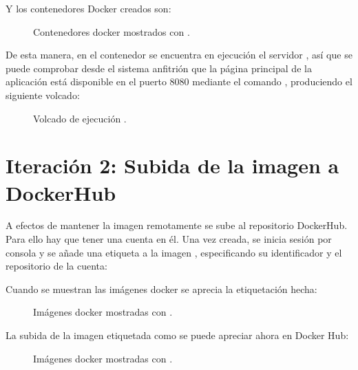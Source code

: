 Y los contenedores Docker creados son:

\begin{figure}[H]
\caption{Contenedores docker mostrados con .\label{fig:figure_placement_example}}
\end{figure}

De esta manera, en el contenedor  se encuentra en ejecución el servidor , así que se puede comprobar desde el sistema anfitrión que la página principal de la aplicación  está disponible en el puerto 8080 mediante el comando , produciendo el siguiente volcado:

\begin{figure}[H]
\caption{Volcado de ejecución .\label{fig:figure_placement_example}}
\end{figure}

\section{Iteración 2: Subida de la imagen a DockerHub}

A efectos de mantener la imagen remotamente se sube al repositorio DockerHub. Para ello hay que tener una cuenta en él. Una vez creada, se inicia sesión por consola y se añade una etiqueta a la imagen , especificando su identificador y el repositorio de la cuenta:


Cuando se muestran las imágenes docker se aprecia la etiquetación hecha:

\begin{figure}[H]
\caption{Imágenes docker mostradas con .\label{fig:figure_placement_example}}
\end{figure}

La subida de la imagen etiquetada como  se puede apreciar ahora en Docker Hub:

\begin{figure}[H]
\caption{Imágenes docker mostradas con .\label{fig:figure_placement_example}}
\end{figure}


